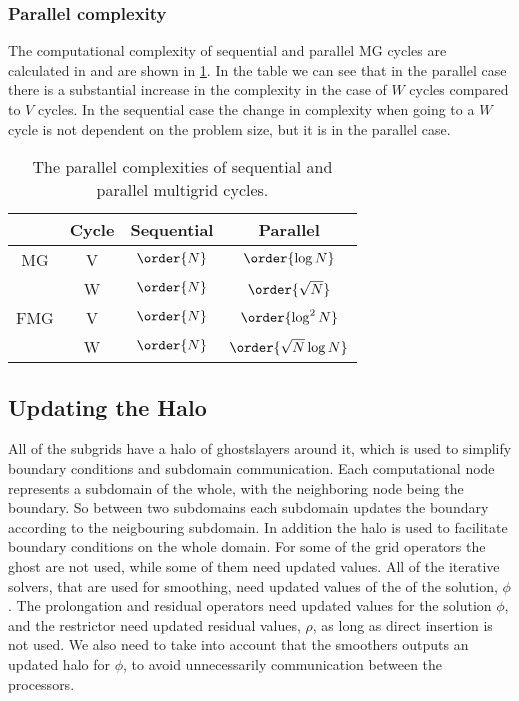 		\subsubsection{Parallel complexity}
			\label{sec:para_comp}
			The computational complexity of sequential and
			parallel MG cycles are calculated in \cite{hackbusch_multigrid_1982} and are
			shown in \cref{tab:parallel_complexity}. In the table we can see that in
			the parallel case there is a substantial increase in the complexity in the
			case of \(W\) cycles compared to \(V\) cycles. In the sequential case the
			change in complexity when going to a \(W\) cycle is not dependent on the
			problem size, but it is in the parallel case.


		\begin{table}
			\centering
			\begin{tabular}{ c  c c c}
				& Cycle & Sequential & Parallel
			  	\\  \hline
			  	MG & V & \(\order{N}\) & \(\order{\log N}\)
			  	\\
			  	& W & $\order{N}$ & $\order{\sqrt{N}}$
			  	\\ \hline
				FMG & V & $\order{N}$ & $\order{\log^2 N}$
				\\
				& W & $\order{N}$ & \( \order{\sqrt{N} \log{N}} \)
			\end{tabular}
			\caption{The parallel complexities of sequential and parallel multigrid cycles. }
			\label{tab:parallel_complexity}
		\end{table}

		\subsection{Updating the Halo}
		All of the subgrids have a halo of ghostslayers around it, which is used to simplify boundary conditions and subdomain communication. Each computational node
		represents a subdomain of the whole, with the neighboring node being the boundary. So between two subdomains each subdomain updates the boundary according to
		the neigbouring subdomain. In addition the halo is used to facilitate boundary conditions on the whole domain. For some of the grid operators
		the ghost are not used, while some of them need updated values. All of the iterative solvers, that are used
		for smoothing, need updated values of the of the solution, \(\phi\). The prolongation and residual operators need updated values
		for the solution \(\phi\), and the restrictor need updated residual values, \(\rho\), as long as direct insertion is not used.
		We also need to take into account that the smoothers outputs an updated halo for \(\phi\), to avoid
		unnecessarily communication between the processors.





